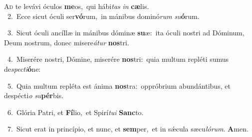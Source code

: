 \lettrine{\initial\textcolor{\initialcolor}{A}}{d} te levávi óculos \textbf{me}\-os,~\star qui hábi\textit{tas} \textit{in} \textbf{cæ}\-lis.\\
{\numbfont\textcolor{\numbcolor}{~2.}}~Ecce sicut óculi ser\-\textbf{vó}\-rum,~\star in mánibus dominó\textit{rum} \textit{su}\-\textbf{ó}rum.\par
{\numbfont\textcolor{\numbcolor}{~3.}}~Sicut óculi ancíllæ in mánibus dóminæ \textbf{su}\-æ:~\star ita óculi nostri ad Dóminum, Deum nostrum, donec misere\-\textit{á}\-\textit{tur} \textbf{nos}\-tri.\par
{\numbfont\textcolor{\numbcolor}{~4.}}~Miserére nostri, Dómine, miserére \textbf{nos}\-tri:~\star quia multum repléti sumus de\-\textit{spec}\-\textit{ti}\textbf{ó}ne:\par
{\numbfont\textcolor{\numbcolor}{~5.}}~Quia multum repléta est ánima \textbf{nos}\-tra:~\star oppróbrium abundántibus, et despécti\textit{o} \textit{su}\-\textbf{pér}bis.\par
{\numbfont\textcolor{\numbcolor}{~6.}}~Glória Patri, et \textbf{Fí}\-lio,~\star et Spirí\-\textit{tu}\-\textit{i} \textbf{Sanc}\-to.\par
{\numbfont\textcolor{\numbcolor}{~7.}}~Sicut erat in princípio, et nunc, et \textbf{sem}\-per,~\star et in sǽcula sæcu\-\textit{ló}\-\textit{rum}. \textbf{A}\-men.\par
